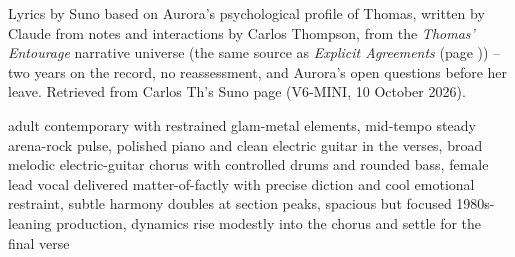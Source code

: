 
\begin{notes}
Lyrics by Suno based on Aurora's psychological profile of Thomas, written by Claude from notes and interactions by Carlos Thompson, from the \emph{Thomas' Entourage} narrative universe (the same source as \emph{Explicit Agreements} (page \pageref{sec:explicit-agreements})) -- two years on the record, no reassessment, and Aurora's open questions before her leave. Retrieved from Carlos Th's Suno page (V6-MINI, 10 October 2026).
\end{notes}
\begin{style}
adult contemporary with restrained glam-metal elements, mid-tempo steady arena-rock pulse, polished piano and clean electric guitar in the verses, broad melodic electric-guitar chorus with controlled drums and rounded bass, female lead vocal delivered matter-of-factly with precise diction and cool emotional restraint, subtle harmony doubles at section peaks, spacious but focused 1980s-leaning production, dynamics rise modestly into the chorus and settle for the final verse
\end{style}
